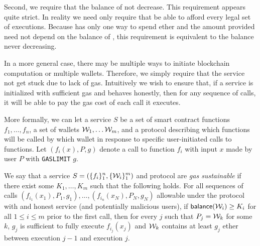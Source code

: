 Second, we require that the balance of \tcadd not decrease.
This requirement appears quite strict.
In reality we need only require that \tc be able to afford every legal set of executions.
Because \tc has only one way to spend ether and the amount provided need not depend on the balance of \tcadd,
this requirement is equivalent to the balance never decreasing.

In a more general case, there may be multiple ways to initiate blockchain computation or multiple wallets.
Therefore, we simply require that the service not get stuck due to lack of gas.
Intuitively we wish to ensure that, if a service is initialized with sufficient gas and behaves honestly,
then for any sequence of calls, it will be able to pay the gas cost of each call it executes.

More formally, we can let a service $S$ be a set of smart contract functions $f_1, \dotsc, f_n$, a set of wallets $\wallet_1, \dotsc \wallet_m$,
and a protocol describing which functions will be called by which wallet in response to specific user-initiated calls to functions.
Let $(f_i(x), P, g)$ denote a call to function $f_i$ with input $x$ made by user $P$ with {\tt GASLIMIT} $g$.

\begin{definition}
  \label{def:gas-sustainability}
  We say that a service $\displaystyle S = \left(\{f_i\}_1^n, \{\wallet_i\}_1^m\right)$ and protocol are \emph{gas sustainable}
  if there exist some $K_1, \dotsc, K_m$ such that the following holds.
  For all sequences of calls $(f_{i_1}(x_1), P_1, g_1), \dotsc, (f_{i_n}(x_N), P_N, g_N)$ allowable under the protocol with and honest service (and potentially malicious users),
  if ${\sf balance}(\wallet_i) \geq K_i$ for all $1 \leq i \leq m$ prior to the first call,
  then for every $j$ such that $P_j = \wallet_k$ for some $k$, $g_j$ is sufficient to fully execute $f_{i_j}(x_j)$ and $\wallet_k$ contains at least $g_j$ ether between execution $j-1$ and execution $j$.
\end{definition}

